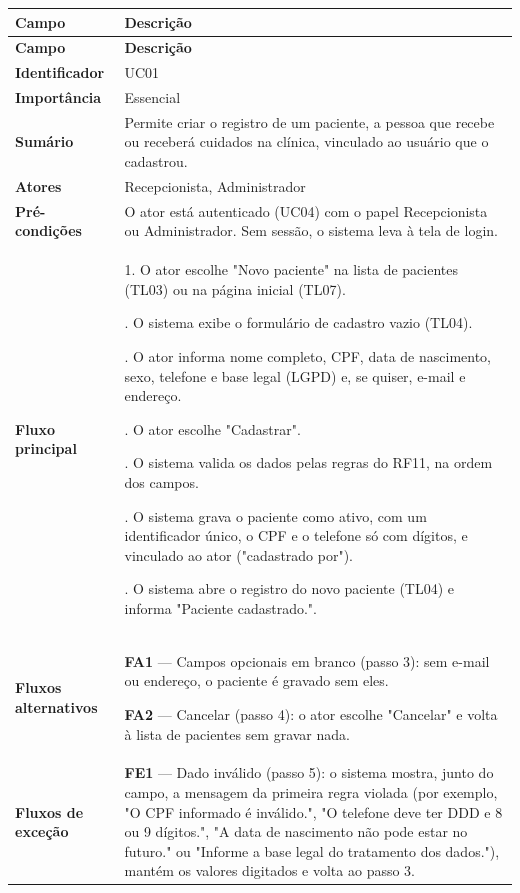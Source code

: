 {\small
\renewcommand{\arraystretch}{1.25}
\setlength{\tabcolsep}{8pt}
\begin{longtable}{|p{}|p{}|}
\hline
\textbf{Campo} & \textbf{Descrição} \\ \hline
\endfirsthead
\hline
\textbf{Campo} & \textbf{Descrição} \\ \hline
\endhead
\textbf{Identificador} & UC01 \\ \hline
\textbf{Importância} & Essencial \\ \hline
\textbf{Sumário} & Permite criar o registro de um paciente, a pessoa que recebe ou receberá cuidados na clínica, vinculado ao usuário que o cadastrou. \\ \hline
\textbf{Atores} & Recepcionista, Administrador \\ \hline
\textbf{Pré-condições} & O ator está autenticado (UC04) com o papel Recepcionista ou Administrador. Sem sessão, o sistema leva à tela de login. \\ \hline
\textbf{Fluxo principal} & 1. O ator escolhe "Novo paciente" na lista de pacientes (TL03) ou na página inicial (TL07).\par\smallskip
2. O sistema exibe o formulário de cadastro vazio (TL04).\par\smallskip
3. O ator informa nome completo, CPF, data de nascimento, sexo, telefone e base legal (LGPD) e, se quiser, e-mail e endereço.\par\smallskip
4. O ator escolhe "Cadastrar".\par\smallskip
5. O sistema valida os dados pelas regras do RF11, na ordem dos campos.\par\smallskip
6. O sistema grava o paciente como ativo, com um identificador único, o CPF e o telefone só com dígitos, e vinculado ao ator ("cadastrado por").\par\smallskip
7. O sistema abre o registro do novo paciente (TL04) e informa "Paciente cadastrado.". \\ \hline
\textbf{Fluxos alternativos} & \textbf{FA1} — Campos opcionais em branco (passo 3): sem e-mail ou endereço, o paciente é gravado sem eles.\par\smallskip
\textbf{FA2} — Cancelar (passo 4): o ator escolhe "Cancelar" e volta à lista de pacientes sem gravar nada. \\ \hline
\textbf{Fluxos de exceção} & \textbf{FE1} — Dado inválido (passo 5): o sistema mostra, junto do campo, a mensagem da primeira regra violada (por exemplo, "O CPF informado é inválido.", "O telefone deve ter DDD e 8 ou 9 dígitos.", "A data de nascimento não pode estar no futuro." ou "Informe a base legal do tratamento dos dados."), mantém os valores digitados e volta ao passo 3.\par\smallskip

\end{longtable}}
